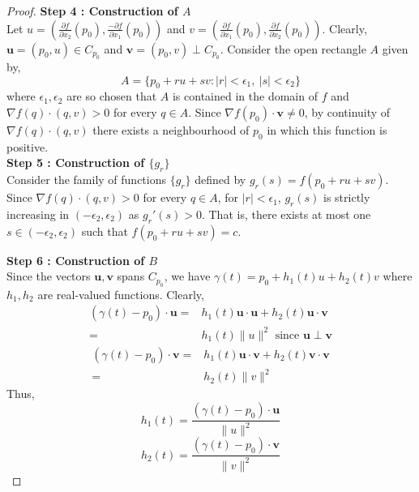 \begin{proof}
	\textbf{Step 4 : Construction of $A$}\\
	Let $u = (\frac{\partial f}{\partial x_2}(p_0),\frac{-\partial f}{\partial x_1}(p_0))$ and $v  = (\frac{\partial f}{\partial x_1}(p_0),\frac{\partial f}{\partial x_2}(p_0))$.
	Clearly, $\boldsymbol{u} = (p_0,u) \in C_{p_0}$ and $\boldsymbol{v} = (p_0,v) \perp C_{p_0}$.
	Consider the open rectangle $A$ given by,
	\[ A = \{p_0+ru+sv : |r| < \epsilon_1,\ |s| < \epsilon_2 \} \]
	where $\epsilon_1, \epsilon_2$ are so chosen that $A$ is contained in the domain of $f$ and $\nabla f(q) \cdot (q,v) > 0$ for every $q \in A$.
	Since $\nabla f(p_0) \cdot \boldsymbol{v} \ne 0$, by continuity of $\nabla f(q) \cdot (q,v)$ there exists a neighbourhood of $p_0$ in which this function is positive.\\


	\textbf{Step 5 : Construction of $\{ g_r \}$}\\
	Consider the family of functions $\{ g_r \}$ defined by $g_r(s) = f(p_0+ru+sv)$.
	Since $\nabla f(q) \cdot (q,v) > 0$ for every $q \in A$, for $|r| < \epsilon_1$, $g_r(s)$ is strictly increasing in $(-\epsilon_2,\epsilon_2)$ as $g_r'(s) > 0$.
	That is, there exists at most one $s \in (-\epsilon_2,\epsilon_2)$ such that $f(p_0+ru+sv) =c$.

	\textbf{Step 6 : Construction of $B$}\\
	Since the vectors $\boldsymbol{u},\boldsymbol{v}$ spans $C_{p_0}$, we have $\gamma(t) = p_0+h_1(t)u + h_2(t)v$ where $h_1,h_2$ are real-valued functions.
	Clearly, 
	\begin{align*}
		(\gamma(t)-p_0) \cdot \boldsymbol{u} = & h_1(t) \boldsymbol{u} \cdot \boldsymbol{u} + h_2(t) \boldsymbol{u} \cdot \boldsymbol{v} \\
		= & h_1(t) \|u\|^2 \text{ since } \boldsymbol{u} \perp \boldsymbol{v}
	\end{align*}
	\begin{align*}
		(\gamma(t)-p_0) \cdot \boldsymbol{v} = & h_1(t) \boldsymbol{u} \cdot \boldsymbol{v} + h_2(t) \boldsymbol{v} \cdot \boldsymbol{v} \\
		= & h_2(t) \| v \|^2
	\end{align*}
	Thus,
	\begin{equation}
		h_1(t) = \frac{(\gamma(t)-p_0) \cdot \boldsymbol{u}}{\| u\|^2}
	\end{equation}
	\begin{equation}
		h_2(t) = \frac{(\gamma(t)-p_0) \cdot \boldsymbol{v}}{\| v\|^2}
	\end{equation}


\end{proof}

